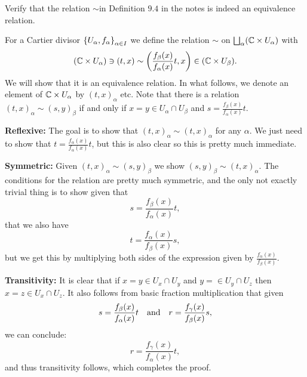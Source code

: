 \documentclass[11pt, a4paper]{article}
\begin{document}
\begin{exercise}
  Verify that the relation $\sim $in Definition $9.4$ in the notes is indeed an
  equivalence relation.
\end{exercise}
\begin{solution}
  For a Cartier divisor $\left\{U_{\alpha},f_{\alpha}\right\}_{\alpha \in I}$
  we define the relation $\sim$ on $\bigsqcup_{\alpha} (\mathbb{C} \times U_{\alpha})$
  with
  \[
    (\C \times U_{\alpha}) \ni 
    (t,x) \sim \del{\frac{f_{\beta}(x)}{f_{\alpha}(x)}t, x}
    \in (\C \times U_{\beta}).
  \]
  We will show that it is an equivalence relation.
  In what follows, we denote an element of $\mathbb{C} \times U_{\alpha}$
  by $(t,x)_{\alpha}$ etc.
  Note that there is a relation $(t,x)_{\alpha} \sim (s,y)_{\beta}$
  if and only if $x = y \in U_{\alpha} \cap U_{\beta}$
  and $s = \frac{f_{\beta}(x)}{f_{\alpha}(x)}t$.
  
  \noindent
  \textbf{Reflexive:}
  The goal is to show that $(t,x)_{\alpha} \sim (t,x)_{\alpha}$ for any $\alpha$.
  We just need to show that $t = \frac{f_{\alpha}(x)}{f_{\alpha}(x)}t$,
  but this is also clear so this is pretty much immediate.
  
  \noindent
  \textbf{Symmetric:}
  Given $(t,x)_{\alpha} \sim (s,y)_{\beta}$
  we show $(s,y)_{\beta} \sim (t,x)_{\alpha}$.
  The conditions for the relation are pretty much symmetric,
  and the only not exactly trivial thing is to show given that
  \[
    s = \frac{f_{\beta}(x)}{f_{\alpha}(x)}t,
  \]
  that we also have
  \[
    t = \frac{f_{\alpha}(x)}{f_{\beta}(x)}s,
  \]
  but we get this by multiplying both sides of the expression given
  by $\frac{f_{\alpha}(x)}{f_{\beta}(x)}$.
  
  \noindent
  \textbf{Transitivity:}
  It is clear that if $x = y \in U_x \cap U_y$
  and $y =  \in U_y \cap U_z$ then $x = z \in U_x \cap U_z$.
  It also follows from basic fraction multiplication that given
  \[
    s = \frac{f_{\beta}(x)}{f_{\alpha}(x)}t \quad \text{and} \quad
    r = \frac{f_{\gamma}(x)}{f_{\beta}(x)}s,
  \]
  we can conclude:
  \[
    r = \frac{f_{\gamma}(x)}{f_{\alpha}(x)}t,
  \]
  and thus transitivity follows,
  which completes the proof.
\end{solution}
\end{document}
